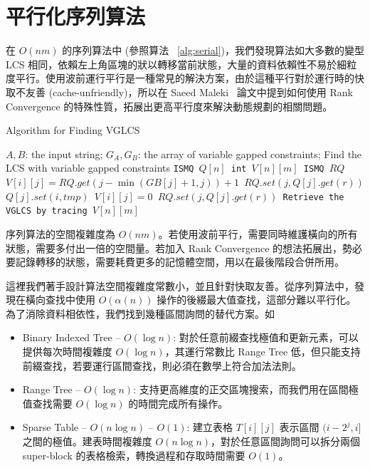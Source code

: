 \documentclass{gapd}
\begin{document}
\section{平行化序列算法} %
\label{sec:parallelSerial}

在 $O(nm)$ 的序列算法中 (參照算法 ~\ref{alg:serial})，我們發現算法如大多數的變型 LCS 相同，依賴左上角區塊的狀以轉移當前狀態，大量的資料依賴性不易於細粒度平行。使用波前運行平行是一種常見的解決方案，由於這種平行對於運行時的快取不友善 (cache-unfriendly)，所以在 Saeed Maleki~\cite{saeed} 論文中提到如何使用 Rank Convergence 的特殊性質，拓展出更高平行度來解決動態規劃的相關問題。

\begin{algorithm*}[!thb]
  \caption{Algorithm for Finding VGLCS}
  \label{alg:serial}
  \begin{algorithmic}[1]
    \Require
      $A, B$: the input string;
      $G_A, G_B$: the array of variable gapped constraints;
    \Ensure Find the LCS with variable gapped constraints
    \State \tt{ISMQ} $Q[n]$
    \State \tt{int} $V[n][m]$
      \State \tt{ISMQ} $RQ$
            \State $V[i][j] = RQ.get(j - \min(GB[j]+1, j))+1$
            \State $RQ.set(j, Q[j].get(r))$
            \State $Q[j].set(i, tmp)$
        \Else
            \State $V[i][j] = 0$
            \State $RQ.set(j, Q[j].get(r))$
        \EndIf
      \EndFor
    \EndFor
    \State Retrieve the VGLCS by tracing $V[n][m]$
  \end{algorithmic}
\end{algorithm*}

序列算法的空間複雜度為 $O(nm)$。若使用波前平行，需要同時維護橫向的所有狀態，需要多付出一倍的空間量。若加入 Rank Convergence 的想法拓展出，勢必要記錄轉移的狀態，需要耗費更多的記憶體空間，用以在最後階段合併所用。

這裡我們著手設計算法空間複雜度常數小，並且針對快取友善。從序列算法中，發現在橫向查找中使用 $O(\alpha(n))$ 操作的後綴最大值查找，這部分難以平行化。為了消除資料相依性，我們找到幾種區間詢問的替代方案。如 

\begin{itemize}
  \item Binary Indexed Tree -- $O(\log n)$: 對於任意前綴查找極值和更新元素，可以提供每次時間複雜度 $O(\log n)$，其運行常數比 Range Tree 低，但只能支持前綴查找，若要運行區間查找，則必須在數學上符合加法法則。
  \item Range Tree -- $O(\log n)$: 支持更高維度的正交區塊搜索，而我們用在區間極值查找需要 $O(\log n)$ 的時間完成所有操作。
  \item Sparse Table -- $O(n \log n)$ -- $O(1)$:
    建立表格 $T[i][j]$ 表示區間 $(i-2^j,i]$ 之間的極值。建表時間複雜度 $O(n \log n)$，對於任意區間詢問可以拆分兩個 super-block 的表格檢索，轉換過程和存取時間需要 $O(1)$。
\end{itemize}
\end{document}
